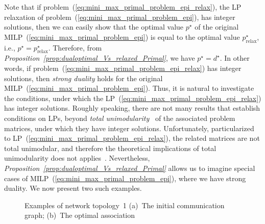 \documentclass[journal, 10pt, twocolumn]{IEEEtran}
\newcommand{\goodgapp}{\hspace{0.1\linewidth}} \newcommand{\goodgap}{\hspace{0.01\linewidth}} \newcommand{\KomM}[2]{{\textbf{{\color{blue!70!black}#1}}}{{\color{red!50!black}#2}}}
\begin{document}
Note that if problem~(\ref{eq:mini_max_primal_problem_epi_relax}), the LP relaxation of problem~(\ref{eq:mini_max_primal_problem_epi}), has integer solutions, then we can easily show that the optimal value $p^\star$ of the original MILP~(\ref{eq:mini_max_primal_problem_epi}) is equal to the optimal value $p^\star_{\mathrm{relax}}$, i.e., $p^\star =p^\star_{\mathrm{relax}}$. Therefore, from \emph{Proposition~\ref{prop:dualoptimal_Vs_relaxed_Primal}}, we have $p^\star =d^\star$. In other words, if problem~(\ref{eq:mini_max_primal_problem_epi_relax}) has integer solutions, then \emph{strong duality} holds for the original MILP~(\ref{eq:mini_max_primal_problem_epi}).
Thus, it is natural to investigate the conditions, under which the LP~(\ref{eq:mini_max_primal_problem_epi_relax}) has integer solutions. Roughly speaking, there are not many results that establish conditions on LPs, beyond \emph{total unimodularity}~\cite[\S~9]{Truemper-98} of the associated problem matrices, under which they have integer solutions. Unfortunately, particularized to LP~(\ref{eq:mini_max_primal_problem_epi_relax}), the related matrices are not total unimodular, and therefore the theoretical implications of total unimodularity does not applies~\cite[\S~9]{Truemper-98}. Nevertheless, \emph{Proposition~\ref{prop:dualoptimal_Vs_relaxed_Primal}} allows us to imagine special cases of MILP~(\ref{eq:mini_max_primal_problem_epi}), where we have strong duality. We now present two such examples.

\begin{figure}[t]
\centering
{}
\goodgapp
{}\vspace{-2mm}
\caption{Examples of network topology~1 (a)~The initial communication graph; (b)~The optimal association}
\label{fig:NW1_and_sol}
\vspace{-3.0mm}
\end{figure}
\end{document}
